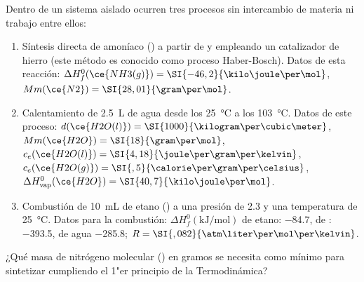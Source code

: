 Dentro de un sistema aislado ocurren tres procesos sin intercambio de materia ni trabajo entre ellos:
\begin{enumerate}
	\item Síntesis directa de amoníaco () a partir de  y  empleando un catalizador de hierro (este método es conocido como proceso Haber-Bosch). Datos de esta reacción: $\Delta H_f^0(\ce{NH3(g)}) = \SI{-46,2}{\kilo\joule\per\mol}$, $Mm(\ce{N2}) = \SI{28,01}{\gram\per\mol}$.
	\item Calentamiento de \SI{2,5}{\liter} de agua desde los \SI{25}{\celsius} a los \SI{103}{\celsius}. Datos de este proceso: $d(\ce{H2O(l)}) = \SI{1000}{\kilogram\per\cubic\meter}$, $Mm(\ce{H2O}) = \SI{18}{\gram\per\mol}$, $c_e(\ce{H2O(l)}) = \SI{4,18}{\joule\per\gram\per\kelvin}$, $c_e(\ce{H2O(g)}) = \SI{,5}{\calorie\per\gram\per\celsius}$, $\Delta H_{\text{vap}}^0(\ce{H2O}) = \SI{40,7}{\kilo\joule\per\mol}$.
	\item Combustión de \SI{10}{\milli\liter} de etano () a una presión de \SI{2,3}{\atm} y una temperatura de \SI{25}{\degreeCelsius}. Datos para la combustión: $\Delta H_f^0 (\unit{\kilo\joule\per\mol})$ de etano: \num{-84,7}, de : \num{-393,5}, de agua \num{-285,8}; $R = \SI{,082}{\atm\liter\per\mol\per\kelvin}$.
\end{enumerate}
¿Qué masa de nitrógeno molecular () en gramos se necesita como mínimo para sintetizar  cumpliendo el 1"er principio de la Termodinámica?

